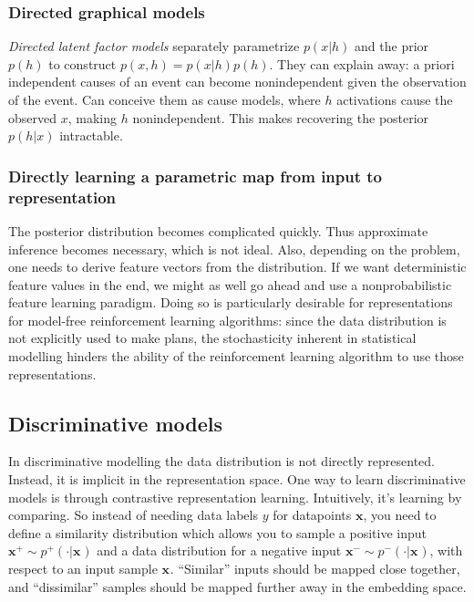 \subsubsection{Directed graphical models}
\textit{Directed latent factor models} separately parametrize
$ p (x|h)  $ and the prior $ p (h)  $ to construct
$ p (x,h) = p (x|h) p (h)  $.
They can explain away: a priori independent causes of an event
can become nonindependent given the observation of the event.
Can conceive them as cause models, where $ h  $ activations
cause the observed $ x  $, making $ h  $ nonindependent.
This makes recovering the posterior $ p (h|x)  $ intractable.

\subsubsection{Directly learning a parametric map from input to representation}
The posterior distribution becomes complicated quickly.
Thus approximate inference becomes necessary, which is not ideal.
Also, depending on the problem, one needs to derive feature vectors
from the distribution.
If we want deterministic feature values in the end, we might as well
go ahead and use a nonprobabilistic feature learning paradigm.
Doing so is particularly desirable for representations for model-free 
reinforcement learning algorithms:
since the data distribution is not explicitly used to make plans,
the stochasticity inherent in statistical modelling hinders the ability
of the reinforcement learning algorithm to use those representations.


\subsection{Discriminative models}
In discriminative modelling the data distribution is not directly represented.
Instead, it is implicit in the representation space. 
One way to learn discriminative models is through contrastive representation learning.
Intuitively, it's learning by comparing.
So instead of needing data labels $ y  $ for datapoints $ \bm{x}$,
you need to define a similarity distribution which allows you to
sample a positive input $ \bm{x}_{}^{ + } \sim p^{ + } (\cdot | \bm{x}_{})  $
and a data distribution for a negative input $ \bm{x}_{}^{ - } \sim p^{ - } (\cdot | \bm{x}_{})  $,
with respect to an input sample $ \bm{x}_{}  $.
``Similar'' inputs should be mapped close together, and ``dissimilar'' samples
should be mapped further away in the embedding space.

